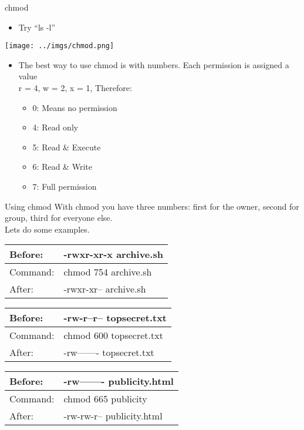 \documentclass{beamer}
\begin{document}
\begin{frame}{chmod}
\begin{itemize}
\item Try ``ls -l''
\end{itemize}
\texttt{[image: ../imgs/chmod.png]}
\begin{itemize}
\item The best way to use chmod is with numbers.  Each permission is assigned a value\\
r = 4, w = 2, x = 1, Therefore:
\begin{itemize}
\item 0: Means no permission
\item 4: Read only
\item 5: Read \& Execute
\item 6: Read \& Write
\item 7: Full permission
\end{itemize}
\end{itemize}
\end{frame}

\begin{frame}{Using chmod}
With chmod you have three numbers: first for the owner, second for group, third for everyone else.\\
Lets do some examples.
\begin{tabular}{| l | l |}
\hline
Before: & -rwxr-xr-x  archive.sh \\ \hline
Command: & chmod 754 archive.sh \\ \hline
After: & -rwxr-xr-- archive.sh \\
\hline
\end{tabular}
\begin{tabular}{| l | l |}
\hline
Before: & -rw-r--r-- topsecret.txt \\ \hline
Command: & chmod 600 topsecret.txt \\ \hline
After: & -rw------- topsecret.txt \\
\hline
\end{tabular}
\begin{tabular}{| l | l |}
\hline
Before: & -rw-------  publicity.html  \\ \hline
Command: & chmod 665 publicity \\ \hline
After: & -rw-rw-r--  publicity.html \\
\hline
\end{tabular}
\end{frame}
\end{document}
